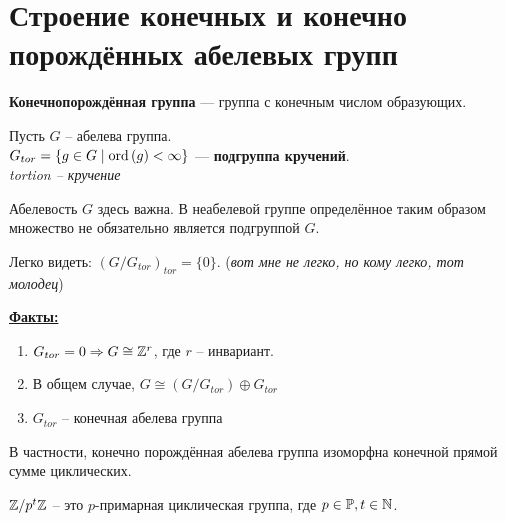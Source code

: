 \section{Строение конечных и конечно порождённых абелевых групп}
\begin{conj}
    \textbf{Конечнопорождённая группа} --- группа с 
    конечным числом образующих.
\end{conj}
\begin{conj} $ $\\
    Пусть $G$ -- абелева группа.\\
    $G_{tor} = \{ g \in G \mid \operatorname{ord}\left( g \right) < \infty \}$
    --- \textbf{подгруппа кручений}.\\
    \textit{tortion -- кручение}
\end{conj}
\notice Абелевость $G$ здесь важна. В неабелевой группе
определённое таким образом множество не обязательно является
подгруппой $G$.

Легко видеть: $(G/G_{tor})_{tor} = \{ 0 \}$. 
(\textit{вот мне не легко, но кому легко, тот молодец})

\underline{\textbf{Факты:}}
\begin{enumerate}
    \item $G_{tor} = 0 \Rightarrow G \cong \mathbb{Z}^r$, 
    где $r$ -- инвариант.
    \item В общем случае, $G \cong (G / G_{tor}) \oplus G_{tor}$
    \item $G_{tor}$ -- конечная абелева группа
\end{enumerate}
\notice В частности, конечно порождённая абелева группа изоморфна
конечной прямой сумме циклических.

\begin{conj}
    $\mathbb{Z}/p^t\mathbb{Z}$ -- это $p$-примарная циклическая группа,
    где $p \in \mathbb{P}, t \in \mathbb{N}$.
\end{conj}

